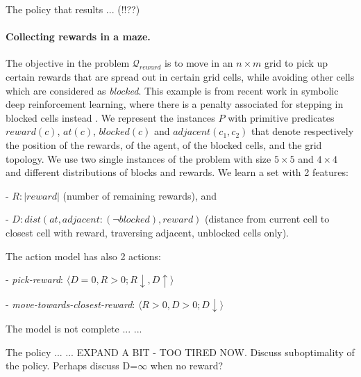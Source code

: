 \documentclass[letterpaper]{article} %
\newcommand{\tuple}[1]{\ensuremath{\langle #1 \rangle}}
\newcommand{\abs}[1]{\ensuremath{\left\vert{#1}\right\vert}}
\newcommand{\Q}{\mathcal{Q}}
\begin{document}
The policy that results ... (!!??)



% 
% 
% 
% 




\paragraph{Collecting rewards in a maze.}
The objective in the problem $\Q_{reward}$ is to move in an $n \times m$ grid to pick up certain
rewards that are spread out in certain grid cells, while avoiding other cells which are considered as \emph{blocked}.
This example is from recent work in symbolic deep
reinforcement learning, where there is a penalty associated for 
stepping in blocked cells instead \cite{garnelo2016towards}.
%
We represent the instances $P$ with primitive predicates $reward(c)$, $at(c)$, $blocked(c)$ and $adjacent(c_1, c_2)$ that denote
respectively the position of the rewards, of the agent, of the blocked cells, and the grid topology.
We use two single instances of the problem with size $5 \times 5$ and $4 \times 4$ and different distributions of blocks and rewards.
We learn a set with 2 features:

- $R: \abs{reward}$ (number of remaining rewards), and

- $D: dist(at, adjacent:(\neg blocked), reward)$ (distance from current cell to closest cell with reward, traversing adjacent, unblocked cells only).

\noindent The action model has also 2 actions:

- \emph{pick-reward}: \tuple{D=0, R > 0;  R \downarrow, D \uparrow}

- \emph{move-towards-closest-reward}: \tuple{R>0, D>0; D \downarrow}

The model is not complete ... 
...

The policy ... 
... EXPAND A BIT - TOO TIRED NOW.
Discuss suboptimality of the policy.
Perhaps discuss D=$\infty$ when no reward?
\end{document}
